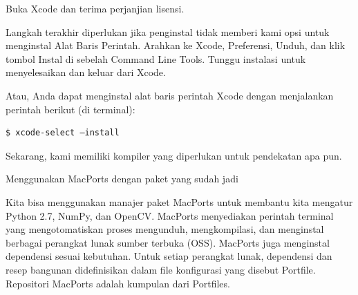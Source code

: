 Buka Xcode dan terima perjanjian lisensi.

Langkah terakhir diperlukan jika penginstal tidak memberi kami opsi untuk menginstal Alat Baris Perintah. Arahkan ke Xcode, Preferensi, Unduh, dan klik tombol Instal di sebelah Command Line Tools. Tunggu instalasi untuk menyelesaikan dan keluar dari Xcode.

Atau, Anda dapat menginstal alat baris perintah Xcode dengan menjalankan perintah berikut (di terminal):
\begin{verbatim}
$ xcode-select –install
\end{verbatim}
Sekarang, kami memiliki kompiler yang diperlukan untuk pendekatan apa pun.

Menggunakan MacPorts dengan paket yang sudah jadi

Kita bisa menggunakan manajer paket MacPorts untuk membantu kita mengatur Python 2.7, NumPy, dan OpenCV. MacPorts menyediakan perintah terminal yang mengotomatiskan proses mengunduh, mengkompilasi, dan menginstal berbagai perangkat lunak sumber terbuka (OSS). MacPorts juga menginstal dependensi sesuai kebutuhan. Untuk setiap perangkat lunak, dependensi dan resep bangunan didefinisikan dalam file konfigurasi yang disebut Portfile. Repositori MacPorts adalah kumpulan dari Portfiles.


